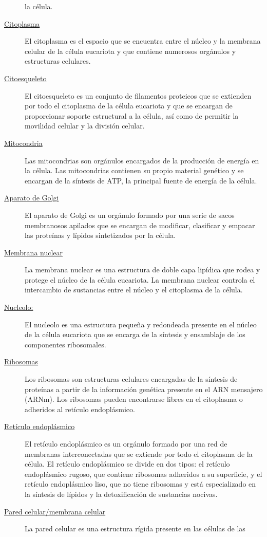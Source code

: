 \documentclass[
]{article}
\begin{document}
\begin{description}
la célula.
\item[\uline{Citoplasma}]
El citoplasma es el espacio que se encuentra entre el núcleo y la
membrana celular de la célula eucariota y que contiene numerosos
orgánulos y estructuras celulares.
\item[\uline{Citoesqueleto}]
El citoesqueleto es un conjunto de filamentos proteicos que se extienden
por todo el citoplasma de la célula eucariota y que se encargan de
proporcionar soporte estructural a la célula, así como de permitir la
movilidad celular y la división celular.
\item[\uline{Mitocondria}]
Las mitocondrias son orgánulos encargados de la producción de energía en
la célula. Las mitocondrias contienen su propio material genético y se
encargan de la síntesis de ATP, la principal fuente de energía de la
célula.
\item[\uline{Aparato de Golgi}]
El aparato de Golgi es un orgánulo formado por una serie de sacos
membranosos apilados que se encargan de modificar, clasificar y empacar
las proteínas y lípidos sintetizados por la célula.
\item[\uline{Membrana nuclear}]
La membrana nuclear es una estructura de doble capa lipídica que rodea y
protege el núcleo de la célula eucariota. La membrana nuclear controla
el intercambio de sustancias entre el núcleo y el citoplasma de la
célula.
\item[\uline{Nucleolo:}]
El nucleolo es una estructura pequeña y redondeada presente en el núcleo
de la célula eucariota que se encarga de la síntesis y ensamblaje de los
componentes ribosomales.
\item[\uline{Ribosomas}]
Los ribosomas son estructuras celulares encargadas de la síntesis de
proteínas a partir de la información genética presente en el ARN
mensajero (ARNm). Los ribosomas pueden encontrarse libres en el
citoplasma o adheridos al retículo endoplásmico.
\item[\uline{Retículo endoplásmico}]
El retículo endoplásmico es un orgánulo formado por una red de membranas
interconectadas que se extiende por todo el citoplasma de la célula. El
retículo endoplásmico se divide en dos tipos: el retículo endoplásmico
rugoso, que contiene ribosomas adheridos a su superficie, y el retículo
endoplásmico liso, que no tiene ribosomas y está especializado en la
síntesis de lípidos y la detoxificación de sustancias nocivas.
\item[\uline{Pared celular/membrana celular}]
La pared celular es una estructura rígida presente en las células de las

\end{description}
\end{document}
